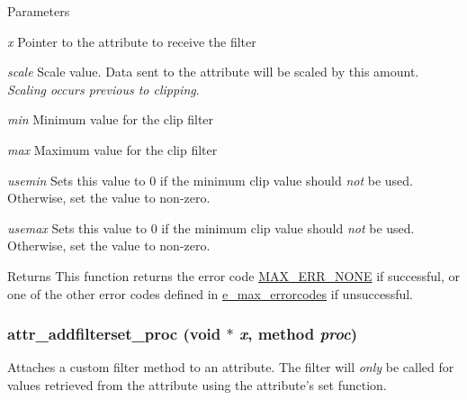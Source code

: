 \begin{DoxyParams}{Parameters}
\item[{\em x}]Pointer to the attribute to receive the filter \item[{\em scale}]Scale value. Data sent to the attribute will be scaled by this amount. {\itshape Scaling occurs previous to clipping\/}. \item[{\em min}]Minimum value for the clip filter \item[{\em max}]Maximum value for the clip filter \item[{\em usemin}]Sets this value to 0 if the minimum clip value should {\itshape not\/} be used. Otherwise, set the value to non-\/zero. \item[{\em usemax}]Sets this value to 0 if the minimum clip value should {\itshape not\/} be used. Otherwise, set the value to non-\/zero.\end{DoxyParams}
\begin{DoxyReturn}{Returns}
This function returns the error code \hyperlink{group__misc_gga0764dd6c02b76cca7d053ae50555d69da6d22f77fef8b1e1b074cef5d29d935fd}{MAX\_\-ERR\_\-NONE} if successful, or one of the other error codes defined in \hyperlink{group__misc_ga0764dd6c02b76cca7d053ae50555d69d}{e\_\-max\_\-errorcodes} if unsuccessful. 
\end{DoxyReturn}
\hypertarget{group__attr_ga1d6d07565f278c27dd34824e253b9eb7}{
\subsubsection[{attr\_\-addfilterset\_\-proc}]{ attr\_\-addfilterset\_\-proc (void $\ast$ {\em x}, \/  {\bf method} {\em proc})}}
\label{group__attr_ga1d6d07565f278c27dd34824e253b9eb7}


Attaches a custom filter method to an attribute. The filter will {\itshape only\/} be called for values retrieved from the attribute using the attribute's {\ttfamily set} function.


